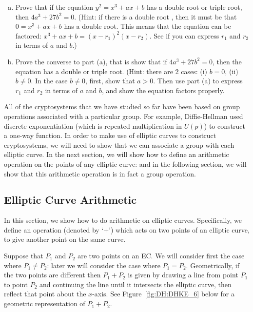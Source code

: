 \begin{exercise}{}
		\begin{enumerate}[(a)] 
	\item  Prove that if the equation $y^2 = x^3 + ax + b$ has a double root or triple root, then $4a^3+27b^2=0$. (Hint:  if there is a double root , then it must be that $0 = x^3 + ax + b$ has a double root. This means that the equation can be factored:  $x^3 + ax+b = (x-r_1)^2(x-r_2)$.  See if you can express $r_1$ and $r_2$ in terms of $a$ and $b$.)\\
	\item Prove the converse to part (a), that is show that if $4a^3 + 27b ^2=0$, then the equation has a double or triple root.  (Hint: there are 2 cases: (i) $b=0$, (ii) $b \neq 0$. In the case $b \neq 0$, first, show that $a > 0$.  Then use part (a) to express $r_1$ and $r_2$ in terms of $a$ and $b$, and show the equation factors properly.
\end {enumerate} 
\end{exercise}

All of the cryptosystems that we have studied so far have been based on group operations associated with a particular group. For example, Diffie-Hellman used discrete exponentiation (which is repeated multiplication in $U(p)$) to construct a one-way function. In order to make use of elliptic curves to construct cryptosystems, we will need to show that we can associate a group with each elliptic curve. In the next section, we will show how to define an arithmetic operation on the points of  any  elliptic curve: and in the following section, we will show that this arithmetic operation is in fact a group operation.

\subsection{Elliptic Curve Arithmetic}\label{subsec:FurtherCryptography:EllipticalCurve:ECA}
In this section, we show how to do arithmetic on elliptic curves. Specifically, we define an operation (denoted by `+') which acts on two points of an elliptic curve, to give another point on the same curve. 

Suppose that $P_1$ and $P_2$ are two points on an EC. We will consider first the case where $P_1 \neq P_2$: later we will consider the case where  $P_1= P_2$. Geometrically, if the two points are different then $P_1 + P_2$ is given by drawing a line from point $P_1$ to point $P_2$ and continuing the line until it intersects the elliptic curve, then reflect that point about the $x$-axis.  See Figure~\ref{fig:DH:DHKE_6} below for a geometric representation of $P_1 + P_2$.

